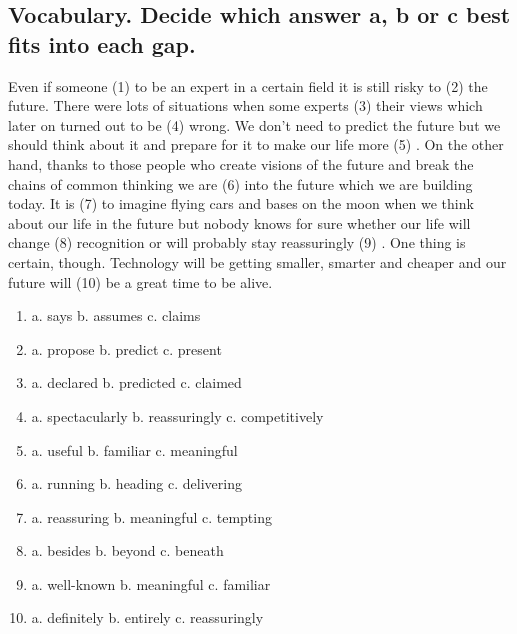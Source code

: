\subsection*{Vocabulary. Decide which answer a, b or c best fits into each gap.}
Even if someone (1) \underline{\hspace{2cm}} to be an expert in a certain field it is still risky to (2) \underline{\hspace{2cm}} the future. There were lots of situations when some experts (3) \underline{\hspace{2cm}} their views which later on turned out to be (4) \underline{\hspace{2cm}} wrong. We don’t need to predict the future but we should think about it and prepare for it to make our life more (5) \underline{\hspace{2cm}}. On the other hand, thanks to those people who create visions of the future and break the chains of common thinking we are (6) \underline{\hspace{2cm}} into the future which we are building today. It is (7) \underline{\hspace{2cm}} to imagine flying cars and bases on the moon when we think about our life in the future but nobody knows for sure whether our life will change (8) \underline{\hspace{2cm}} recognition or will probably stay reassuringly (9) \underline{\hspace{2cm}}. One thing is certain, though. Technology will be getting smaller, smarter and cheaper and our future will (10) \underline{\hspace{2cm}} be a great time to be alive.

\begin{enumerate}
      \item a. says \hfill b. assumes \hfill c. claims
      \item a. propose \hfill b. predict \hfill c. present
      \item a. declared \hfill b. predicted \hfill c. claimed
      \item a. spectacularly \hfill b. reassuringly \hfill c. competitively
      \item a. useful \hfill b. familiar \hfill c. meaningful
      \item a. running \hfill b. heading \hfill c. delivering
      \item a. reassuring \hfill b. meaningful \hfill c. tempting
      \item a. besides \hfill b. beyond \hfill c. beneath
      \item a. well-known \hfill b. meaningful \hfill c. familiar
      \item a. definitely \hfill b. entirely \hfill c. reassuringly
\end{enumerate}

